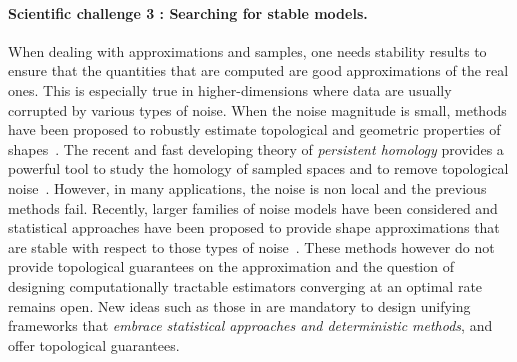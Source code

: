 \paragraph{Scientific challenge 3 : Searching for stable models.} 
When dealing with approximations and samples, one needs stability results to ensure that the quantities that are computed are good approximations of the real ones. This is especially true in higher-dimensions where data are usually corrupted by various types of noise.  When the noise magnitude is small, methods have been proposed to robustly estimate topological and geometric properties of shapes~\cite{nsw-tvu-2011}.  The recent and fast developing theory of {\em persistent homology} provides a powerful tool to study  the homology of sampled spaces and to remove topological noise~\cite{eh-ph-2008}.
However, in  many applications, the noise is non local and the previous methods fail.
Recently,  larger families of noise models  have been considered and statistical approaches  have been proposed to provide shape approximations that are stable with respect to   those types of noise~\cite{gpvw-mme-2011}. These methods however do not provide topological guarantees on the approximation and the question of designing computationally tractable estimators converging at an optimal rate remains open. New ideas such as those in \cite{ccsm-gipm-2011} are mandatory to 
design  unifying frameworks that {\em embrace statistical approaches and deterministic methods}, and offer topological guarantees. 


\vspace{-3mm}

